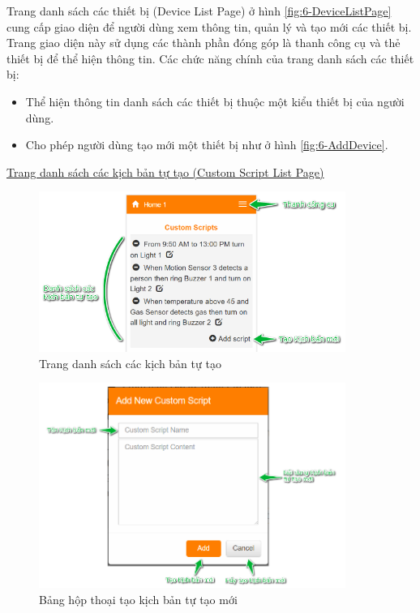\documentclass[12pt,a4paper,oneside]{extbook}
\begin{document}
Trang danh sách các thiết bị (Device List Page) ở hình \ref{fig:6-DeviceListPage} cung cấp giao diện để người dùng xem thông tin, quản lý và tạo mới các thiết bị. Trang giao diện này sử dụng các thành phần đóng góp là thanh công cụ và thẻ thiết bị để thể hiện thông tin. Các chức năng chính của trang danh sách các thiết bị:

\begin{itemize}[topsep=1mm,itemsep=-0.5mm]
\item Thể hiện thông tin danh sách các thiết bị thuộc một kiểu thiết bị của người dùng.
\item Cho phép người dùng tạo mới một thiết bị như ở hình \ref{fig:6-AddDevice}.
\vspace{1mm}
\end{itemize}

\underline{Trang danh sách các kịch bản tự tạo (Custom Script List Page)}

\begin{figure}[h]
  \centering
     \includegraphics[width=10cm]{6-CustomScriptList}
  \caption{Trang danh sách các kịch bản tự tạo}\label{fig:6-CustomScriptList}
\end{figure}

\begin{figure}[h]
  \centering
     \includegraphics[width=10cm]{6-AddCustomScript}
  \caption{Bảng hộp thoại tạo kịch bản tự tạo mới}\label{fig:6-AddCustomScript}
\end{figure}
\end{document}
